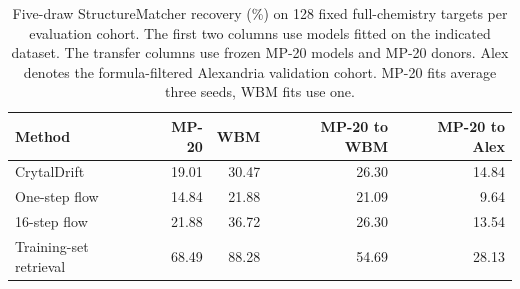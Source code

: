 \begin{table}[!htbp]
\centering\small
\caption{Five-draw StructureMatcher recovery (\%) on 128 fixed full-chemistry targets per evaluation cohort. The first two columns use models fitted on the indicated dataset. The transfer columns use frozen MP-20 models and MP-20 donors. Alex denotes the formula-filtered Alexandria validation cohort. MP-20 fits average three seeds, WBM fits use one.}
\begin{tabular}{lrrrr}\hline
Method & MP-20 & WBM & MP-20 to WBM & MP-20 to Alex\\\hline
CrytalDrift & 19.01 & 30.47 & 26.30 & 14.84\\
One-step flow & 14.84 & 21.88 & 21.09 & 9.64\\
16-step flow & 21.88 & 36.72 & 26.30 & 13.54\\
Training-set retrieval & 68.49 & 88.28 & 54.69 & 28.13\\
\hline\end{tabular}
\end{table}
